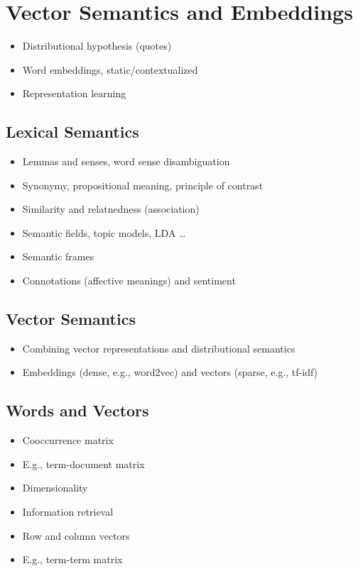 \section{Vector Semantics and Embeddings}

\begin{itemize}
  \item Distributional hypothesis (quotes)
  \item Word embeddings, static/contextualized
  \item Representation learning
\end{itemize}

\subsection{Lexical Semantics}

\begin{itemize}
  \item Lemmas and senses, word sense disambiguation
  \item Synonymy, propositional meaning, principle of contrast
  \item Similarity and relatnedness (association)
  \item Semantic fields, topic models, LDA \ldots
  \item Semantic frames
  \item Connotations (affective meanings) and sentiment
\end{itemize}

\subsection{Vector Semantics}

\begin{itemize}
  \item Combining vector representations and distributional semantics
  \item Embeddings (dense, e.g., word2vec) and vectors (sparse, e.g., tf-idf)
\end{itemize}

\subsection{Words and Vectors}

\begin{itemize}
  \item Cooccurrence matrix
  \item E.g., term-document matrix
  \item Dimensionality
  \item Information retrieval
  \item Row and column vectors
  \item E.g., term-term matrix
\end{itemize}

